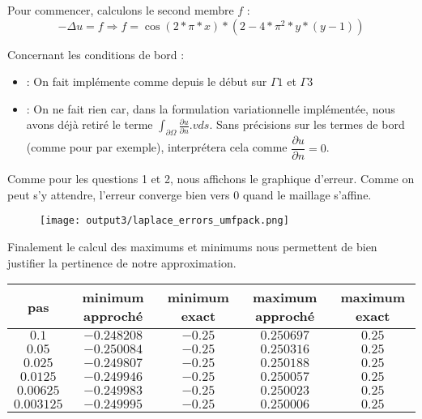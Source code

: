 \documentclass[11pt,a4paper]{report}
\begin{document}
			Pour commencer, calculons le second membre $f$ : 
			\[
			-\Delta u = f \Longrightarrow f = \cos(2*\pi*x)*(2 - 4*\pi^2*y*(y-1))
 			\]
 			
 			Concernant les conditions de bord : 
 			\begin{itemize}
 				\item {} : On fait implémente comme depuis le début sur $\Gamma 1$ et $\Gamma 3$
 				\item {} : On ne fait rien car, dans la formulation variationnelle implémentée, nous avons déjà retiré le terme $\displaystyle \int_{\partial\Omega} \frac{\partial u }{\partial n}.v ds$. Sans précisions sur les termes de bord (comme pour  par exemple), interprétera cela comme $\dfrac{\partial u}{\partial n} = 0$.
 			\end{itemize}
 		
 			Comme pour les questions 1 et 2, nous affichons le graphique d'erreur. Comme on peut s'y attendre, l'erreur converge bien vers $0$ quand le maillage s'affine. 
 			
			\begin{figure}[H]
			\centering
			\texttt{[image: output3/laplace\_errors\_umfpack.png]}
			\end{figure}
		
			 Finalement le calcul des maximums et minimums nous permettent de bien justifier la pertinence de notre approximation.
			\begin{center}
				\begin{tabular}{|c|c|c|c|c|}
					\hline
					pas & minimum approché & minimum exact & maximum approché & maximum exact \\
					\hline 
					$0.1$ & $-0.248208$ & $-0.25$ & $0.250697$ & $0.25$\\ 
					\hline 
					$0.05$ & $-0.250084$ & $-0.25$ & $0.250316$ & $0.25$\\ 
					\hline 
					$0.025$ & $-0.249807$ & $-0.25$ & $0.250188$ & $0.25$  \\ 
					\hline 
					$0.0125$ & $-0.249946$ & $-0.25$ & $0.250057 $ & $0.25$\\ 
					\hline 
					$0.00625$ & $-0.249983$ & $-0.25$ & $0.250023$ & $0.25$ \\ 
					\hline 
					$0.003125$ & $-0.249995$ & $-0.25$ & $0.250006$ & $0.25$ \\ 
					\hline 
				\end{tabular} 
			\end{center}
		
\end{document}
